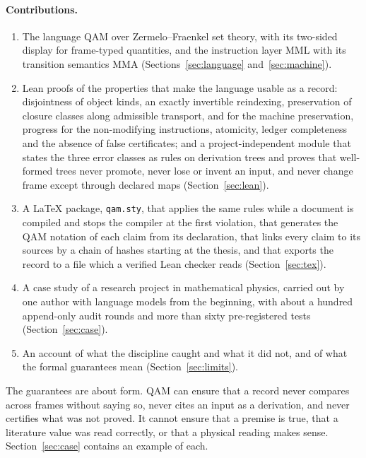 \paragraph{Contributions.}
\begin{enumerate}
\item The language QAM over Zermelo--Fraenkel set theory, with its two-sided display for frame-typed quantities, and the instruction
layer MML with its transition semantics MMA (Sections~\ref{sec:language} and~\ref{sec:machine}).
\item Lean proofs of the properties that make the language usable as a record: disjointness of object kinds, an exactly invertible
reindexing, preservation of closure classes along admissible transport, and for the machine preservation, progress for the
non-modifying instructions, atomicity, ledger completeness and the absence of false certificates; and a project-independent module that
states the three error classes as rules on derivation trees and proves that well-formed trees never promote, never lose or invent an
input, and never change frame except through declared maps (Section~\ref{sec:lean}).
\item A \LaTeX{} package, \texttt{qam.sty}, that applies the same rules while a document is compiled and stops the compiler at the first
violation, that generates the QAM notation of each claim from its declaration, that links every claim to its sources by a chain of hashes starting at the thesis, and that exports
the record to a file which a verified Lean checker reads (Section~\ref{sec:tex}).
\item A case study of a research project in mathematical physics, carried out by one author with language models from the beginning,
with about a hundred append-only audit rounds and more than sixty pre-registered tests (Section~\ref{sec:case}).
\item An account of what the discipline caught and what it did not, and of what the formal guarantees mean (Section~\ref{sec:limits}).
\end{enumerate}

The guarantees are about form.  QAM can ensure that a record never compares across frames without saying so, never cites an input as a
derivation, and never certifies what was not proved.  It cannot ensure that a premise is true, that a literature value was read
correctly, or that a physical reading makes sense.  Section~\ref{sec:case} contains an example of each.
